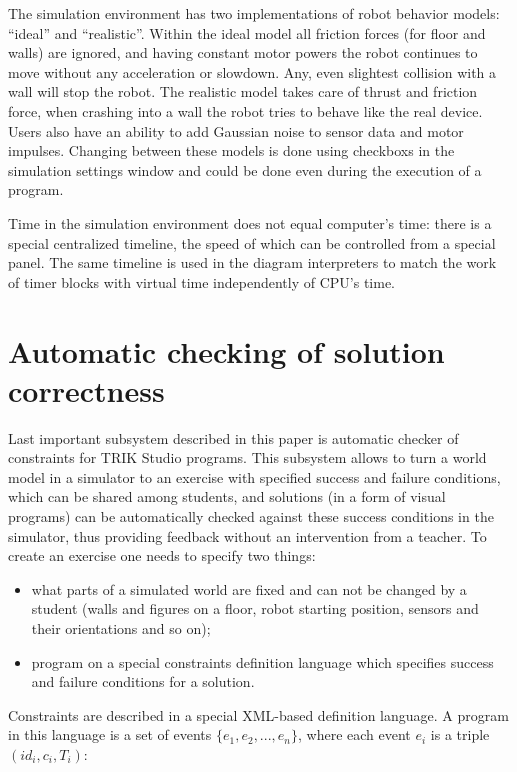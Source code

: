 \documentclass[conference]{IEEEtran}
\begin{document}
The simulation environment has two implementations of robot behavior models: ``ideal'' and ``realistic''. Within the ideal model all friction forces (for floor and walls) are ignored, and having constant motor powers the robot continues to move without any acceleration or slowdown. Any, even slightest collision with a wall will stop the robot. The realistic model takes care of thrust and friction force, when crashing into a wall the robot tries to behave like the real device. Users also have an ability to add Gaussian noise to sensor data and motor impulses. Changing between these models is done using checkboxs in the simulation settings window and could be done even during the execution of a program. 

Time in the simulation environment does not equal computer's time: there is a special centralized timeline, the speed of which can be controlled from a special panel. The same timeline is used in the diagram interpreters to match the work of timer blocks with virtual time independently of CPU's time.

\section{Automatic checking of solution correctness}
\label{chapter:constraintsChecker}

Last important subsystem described in this paper is automatic checker of constraints for TRIK Studio programs. This subsystem allows to turn a world model in a simulator to an exercise with specified success and failure conditions, which can be shared among students, and solutions (in a form of visual programs) can be automatically checked against these success conditions in the simulator, thus providing feedback without an intervention from a teacher. To create an exercise one needs to specify two things:

\begin{itemize}
    \item what parts of a simulated world are fixed and can not be changed by a student (walls and figures on a floor, robot starting position, sensors and their orientations and so on);
    \item program on a special constraints definition language which specifies success and failure conditions for a solution.
\end{itemize}

Constraints are described in a special XML-based definition language. A program in this language is a set of events $\{ e_1, e_2, ..., e_n \}$, where each event $e_i$ is a triple $(id_i, c_i, T_i)$:
\end{document}
